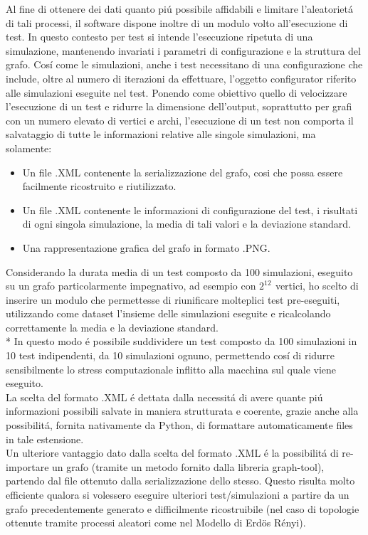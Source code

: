 \documentclass[../Tesi.tex]{subfiles}
\begin{document}
Al fine di ottenere dei dati quanto pi\'u possibile affidabili e limitare l'aleatoriet\'a di tali processi, il software dispone inoltre di un modulo volto all'esecuzione di test. In questo contesto per test si intende l'esecuzione ripetuta di una simulazione, mantenendo invariati i parametri di configurazione e la struttura del grafo. Cos\'i come le simulazioni, anche i test necessitano di una configurazione che include, oltre al numero di iterazioni da effettuare, l'oggetto configurator riferito alle simulazioni eseguite nel test.
Ponendo come obiettivo quello di velocizzare l'esecuzione di un test e ridurre la dimensione dell'output, soprattutto per grafi con un numero elevato di vertici e archi, l'esecuzione di un test non comporta il salvataggio di tutte le informazioni relative alle singole simulazioni, ma solamente:
\begin{itemize}
\item Un file .XML contenente la serializzazione del grafo, cosi che possa essere facilmente ricostruito e riutilizzato.
\item Un file .XML contenente le informazioni di configurazione del test, i risultati di ogni singola simulazione, la media di tali valori e la deviazione standard.
\item Una rappresentazione grafica del grafo in formato .PNG.
\end{itemize}
Considerando la durata media di un test composto da 100 simulazioni, eseguito su un grafo particolarmente impegnativo, ad esempio con $2^{12^{\mathrm{}}}$ vertici, ho scelto di inserire un modulo che permettesse di riunificare molteplici test pre-eseguiti, utilizzando come dataset l'insieme delle simulazioni eseguite e ricalcolando correttamente la media e la deviazione standard.\\*
In questo modo \'e possibile suddividere un test composto da 100 simulazioni in 10 test indipendenti, da 10 simulazioni ognuno, permettendo cos\'i di ridurre sensibilmente lo stress computazionale inflitto alla macchina sul quale viene eseguito.\\
La scelta del formato .XML \'e dettata dalla necessit\'a di avere quante pi\'u informazioni possibili salvate in maniera strutturata e coerente, grazie anche alla possibilit\'a, fornita nativamente da Python, di formattare automaticamente files in tale estensione.\\
Un ulteriore vantaggio dato dalla scelta del formato .XML \'e la possibilit\'a di re-importare un grafo (tramite un metodo fornito dalla libreria graph-tool), partendo dal file ottenuto dalla serializzazione dello stesso. Questo risulta molto efficiente qualora si volessero eseguire ulteriori test/simulazioni a partire da un grafo precedentemente generato e difficilmente ricostruibile (nel caso di topologie ottenute tramite processi aleatori come nel Modello di Erd{\"o}s R\'enyi).
\end{document}

